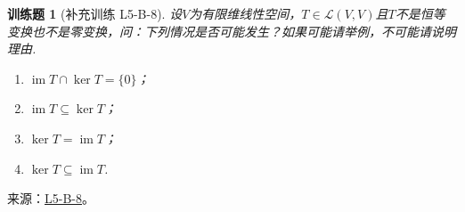 \documentclass[12pt,fontset=fandol]{ctexart}
\newtheorem{exercise}{训练题}[section]
\begin{document}
\begin{exercise}[补充训练 L5-B-8]\label{prob:L5-B-8}
设$V$为有限维线性空间，$T\in \mathcal{L}(V,V)$且$T$不是恒等变换也不是零变换，问：下列情况是否可能发生？如果可能请举例，不可能请说明理由.
        \begin{enumerate}
            \item $\operatorname{im} T \cap \ker T = \{0\}$；

            \item $\operatorname{im} T \subseteq \ker T$；

            \item $\ker T = \operatorname{im} T$；

            \item $\ker T \subseteq \operatorname{im} T$.
        \end{enumerate}
\end{exercise}
\noindent 来源：\href{https://github.com/yhwu-is/Linear-Algebra-Left-Undone/blob/new/%E8%AE%B2%E4%B9%89/%E4%B8%93%E9%A2%98/5%20%E7%BA%BF%E6%80%A7%E6%98%A0%E5%B0%84.tex}{L5-B-8}。
\end{document}
